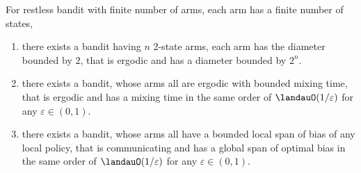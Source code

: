 \begin{thm}
    For restless bandit with finite number of arms, each arm has a finite number of states,
    \begin{enumerate}[label=(\roman*)]
        \item \label{thm:diam} there exists a bandit having $n$ 2-state arms, each arm has the diameter bounded by $2$, that is ergodic and has a diameter bounded by $2^n$. %
        \item \label{thm:mixing} there exists a bandit, whose arms all are ergodic with bounded mixing time, that is ergodic and has a mixing time in the same order of $\landauO(1/\varepsilon)$ for any $\varepsilon\in(0,1)$.
        \item \label{thm:span} there exists a bandit, whose arms all have a bounded local span of bias of any local policy, that is communicating and has a global span of optimal bias in the same order of $\landauO(1/\varepsilon)$ for any $\varepsilon\in(0,1)$.
    \end{enumerate}
\end{thm}
